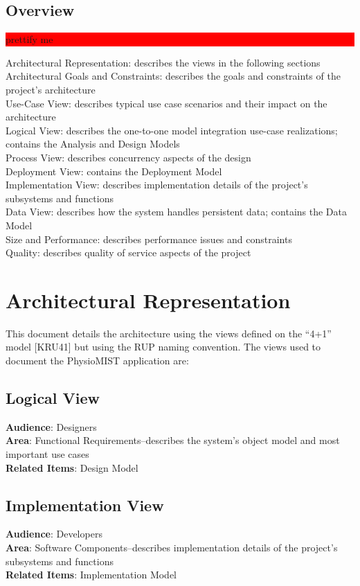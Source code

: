 \documentclass{article}
\newcommand{\todo}[1]{\colorbox{red}{\begin{minipage}{\textwidth}{#1}\end{minipage}}}
\begin{document}
\subsection{Overview}
\todo{prettify me}
Architectural Representation: describes the views in the following sections\\
Architectural Goals and Constraints: describes the goals and constraints of the project's architecture\\
Use-Case View: describes typical use case scenarios and their impact on the architecture\\
Logical View: describes the one-to-one model integration use-case realizations; contains the Analysis and Design Models\\
Process View: describes concurrency aspects of the design\\
Deployment View: contains the Deployment Model\\
Implementation View: describes implementation details of the project's subsystems and functions\\
Data View: describes how the system handles persistent data; contains the Data Model\\
Size and Performance: describes performance issues and constraints\\
Quality: describes quality of service aspects of the project

\section{Architectural Representation}
This document details the architecture using the views defined on the ``4+1'' model [KRU41] but using the RUP naming convention.
The views used to document the PhysioMIST application are:
\subsection{Logical View}
\textbf{Audience}: Designers\\
\textbf{Area}: Functional Requirements--describes the system's object model and most important use cases\\
\textbf{Related Items}: Design Model
\subsection{Implementation View}
\textbf{Audience}: Developers\\
\textbf{Area}: Software Components--describes implementation details of the project's subsystems and functions\\
\textbf{Related Items}: Implementation Model
\end{document}
